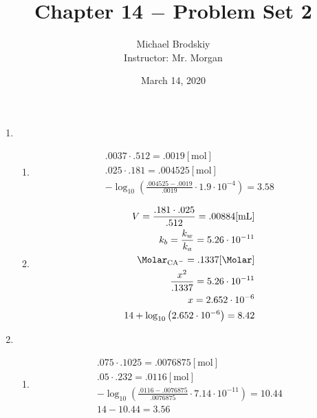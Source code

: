\documentclass[12pt]{article}
\title{Chapter 14 $-$ Problem Set 2}
\date{March 14, 2020}
\author{Michael Brodskiy\\ \small Instructor: Mr. Morgan}
\begin{document}
\maketitle

\begin{enumerate}

  \item

    \begin{enumerate}

      \item 

        \begin{equation}
          \begin{split}
            .0037\cdot.512=.0019[\si{\mole}]\\
            .025\cdot.181=.004525[\si{\mole}]\\
            -\log_{10}\left( \frac{.004525-.0019}{.0019}\cdot1.9\cdot10^{-4} \right)=3.58
          \end{split}
          \label{1}
        \end{equation}

      \item {}

        \begin{equation}
          \begin{split}
            V=\frac{.181\cdot.025}{.512}=.00884[\si{\milli\liter}]\\
            k_b=\frac{k_w}{k_a}=5.26\cdot10^{-11}\\
            \si{\Molar}_{\ce{CA-}}=.1337[\si{\Molar}]\\
            \frac{x^2}{.1337}=5.26\cdot10^{-11}\\
            x=2.652\cdot10^{-6}\\
            14+\log_{10}\left( 2.652\cdot10^{-6} \right)=8.42
          \end{split}
          \label{2}
        \end{equation}

    \end{enumerate}

  \item

    \begin{enumerate}

      \item 

        \begin{equation}
          \begin{split}
            .075\cdot.1025=.0076875[\si{\mole}]\\
            .05\cdot.232=.0116[\si{\mole}]\\
            -\log_{10}\left( \frac{.0116-.0076875}{.0076875}\cdot7.14\cdot10^{-11} \right)=10.44\\
            14-10.44=3.56
          \end{split}
          \label{3}
        \end{equation}


\end{enumerate}
\end{enumerate}
\end{document}

